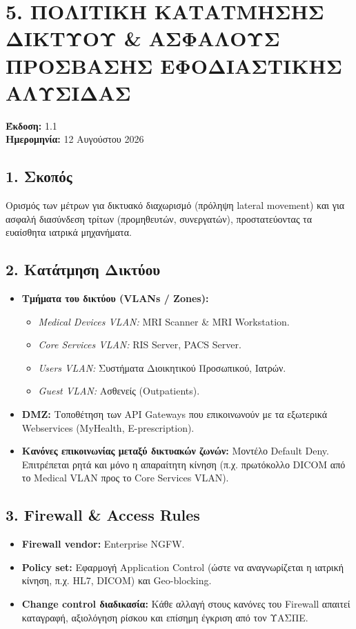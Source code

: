 \documentclass[11pt,a4paper]{article}
\begin{document}
\section*{5. ΠΟΛΙΤΙΚΗ ΚΑΤΑΤΜΗΣΗΣ ΔΙΚΤΥΟΥ \& ΑΣΦΑΛΟΥΣ ΠΡΟΣΒΑΣΗΣ ΕΦΟΔΙΑΣΤΙΚΗΣ ΑΛΥΣΙΔΑΣ}
\textbf{Έκδοση:} 1.1\\
\textbf{Ημερομηνία:} 12 Αυγούστου 2026

\subsection*{1. Σκοπός}
Ορισμός των μέτρων για δικτυακό διαχωρισμό (πρόληψη lateral movement) και για ασφαλή διασύνδεση τρίτων (προμηθευτών, συνεργατών), προστατεύοντας τα ευαίσθητα ιατρικά μηχανήματα.

\subsection*{2. Κατάτμηση Δικτύου}
\begin{itemize}
    \item \textbf{Τμήματα του δικτύου (VLANs / Zones):}
    \begin{itemize}
        \item \textit{Medical Devices VLAN:} MRI Scanner \& MRI Workstation.
        \item \textit{Core Services VLAN:} RIS Server, PACS Server.
        \item \textit{Users VLAN:} Συστήματα Διοικητικού Προσωπικού, Ιατρών.
        \item \textit{Guest VLAN:} Ασθενείς (Outpatients).
    \end{itemize}
    \item \textbf{DMZ:} Τοποθέτηση των API Gateways που επικοινωνούν με τα εξωτερικά Webservices (MyHealth, E-prescription).
    \item \textbf{Κανόνες επικοινωνίας μεταξύ δικτυακών ζωνών:} Μοντέλο Default Deny. Επιτρέπεται ρητά και μόνο η απαραίτητη κίνηση (π.χ. πρωτόκολλο DICOM από το Medical VLAN προς το Core Services VLAN).
\end{itemize}

\subsection*{3. Firewall \& Access Rules}
\begin{itemize}
    \item \textbf{Firewall vendor:} Enterprise NGFW.
    \item \textbf{Policy set:} Εφαρμογή Application Control (ώστε να αναγνωρίζεται η ιατρική κίνηση, π.χ. HL7, DICOM) και Geo-blocking.
    \item \textbf{Change control διαδικασία:} Κάθε αλλαγή στους κανόνες του Firewall απαιτεί καταγραφή, αξιολόγηση ρίσκου και επίσημη έγκριση από τον ΥΑΣΠΕ.
\end{itemize}
\end{document}
